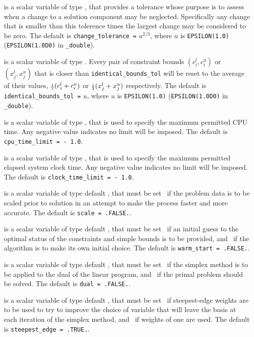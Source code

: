 \begin{description}
 is a scalar variable of type \realdp, that
provides a tolerance whose purpose is to assess when a
change to a solution component may be neglected. Specifically
any change that is smaller than this tolerence times the
largest change may be considered to be zero.
The default is {\tt change\_tolerance =} $u^{2/3}$,
where $u$ is {\tt EPSILON(1.0)} ({\tt EPSILON(1.0D0)} in
{\tt \fullpackagename\_double}).

is a scalar variable of type \realdp.
Every pair of constraint bounds
$(c_{i}^{l}, c_{i}^{u})$ or $(x_{j}^{l}, x_{j}^{u})$
that is closer than {\tt identical\_bounds\_tol}
will be reset to the average of their values,
${\scriptstyle \frac{1}{2}} (c_{i}^{l} + c_{i}^{u})$ or ${\scriptstyle \frac{1}{2}} (x_{j}^{l} + x_{j}^{u})$
respectively.
The default is {\tt identical\_bounds\_tol =} $u$,
where $u$ is {\tt EPSILON(1.0)} ({\tt EPSILON(1.0D0)} in
{\tt \fullpackagename\_double}).

 is a scalar variable of type \realdp,
that is used to specify the maximum permitted CPU time. Any negative
value indicates no limit will be imposed. The default is
{\tt cpu\_time\_limit = - 1.0}.

 is a scalar variable of type \realdp,
that is used to specify the maximum permitted elapsed system clock time.
Any negative value indicates no limit will be imposed. The default is
{\tt clock\_time\_limit = - 1.0}.

 is a scalar variable of type
default \logical, that must be set \true\ if the problem data
is to be scaled prior to solution in an attempt to make the
process faster and more accurate.
The default is {\tt scale = .FALSE.}.

 is a scalar variable of type default \logical,
that must be set \true\ if an initial guess to the optimal
status of the constraints and simple bounds is to be provided,
and  \false\ if the algorithm is to make its own initial choice.
The default is {\tt warm\_start = .FALSE.}.

 is a scalar variable of type default \logical,
that must be set \true\ if the simplex method is to be applied to
the dual of the linear program,
and  \false\ if the primal problem should be solved.
The default is {\tt dual = .FALSE.}.

 is a scalar variable of type default \logical,
that must be set \true\ if steepest-edge weights are to be used to
try to improve the choice of variable that will leave the basis at
each iteration of the simplex method,
and  \false\ if weights of one are used.
The default is {\tt steepest\_edge = .TRUE.}.


\end{description}
